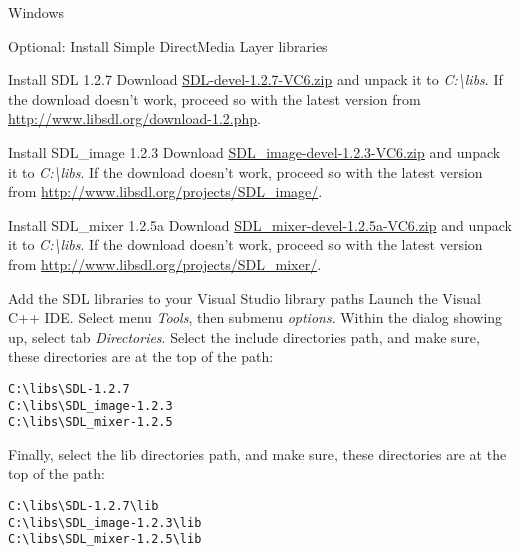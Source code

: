\begin{section}{Windows}
\begin{subsection}{Optional: Install Simple DirectMedia Layer libraries}
\begin{subsubsection}{Install SDL 1.2.7}
Download \href{http://www.libsdl.org/release/SDL-devel-1.2.7-VC6.zip}{SDL-devel-1.2.7-VC6.zip} and unpack it to \textit{C:\textbackslash{}libs}.
If the download doesn't work, proceed so with the latest version from \href{http://www.libsdl.org/download-1.2.php}{http://www.libsdl.org/download-1.2.php}.
\end{subsubsection}%

\begin{subsubsection}{Install SDL\_image 1.2.3}
Download \href{http://www.libsdl.org/projects/SDL_image/release/SDL_image-devel-1.2.3-VC6.zip}{SDL\_image-devel-1.2.3-VC6.zip} and unpack it to \textit{C:\textbackslash{}libs}.
If the download doesn't work, proceed so with the latest version from \href{http://www.libsdl.org/projects/SDL_image/}{http://www.libsdl.org/projects/SDL\_image/}.
\end{subsubsection}%

\begin{subsubsection}{Install SDL\_mixer 1.2.5a}
Download \href{http://www.libsdl.org/projects/SDL_mixer/release/SDL_mixer-devel-1.2.5a-VC6.zip}{SDL\_mixer-devel-1.2.5a-VC6.zip} and unpack it to \textit{C:\textbackslash{}libs}.
If the download doesn't work, proceed so with the latest version from \href{http://www.libsdl.org/projects/SDL_mixer/}{http://www.libsdl.org/projects/SDL\_mixer/}.
\end{subsubsection}%

\begin{subsubsection}{Add the SDL libraries to your Visual Studio library paths}
Launch the Visual C++ IDE. Select menu \textit{Tools}, then submenu \textit{options}. Within the dialog showing up, select tab \textit{Directories}. Select the include directories path, and make sure, these directories are at the top of the path:

\begin{verbatim}
C:\libs\SDL-1.2.7
C:\libs\SDL_image-1.2.3
C:\libs\SDL_mixer-1.2.5
\end{verbatim}

Finally, select the lib directories path, and make sure, these directories are at the top of the path:

\begin{verbatim}
C:\libs\SDL-1.2.7\lib
C:\libs\SDL_image-1.2.3\lib
C:\libs\SDL_mixer-1.2.5\lib
\end{verbatim}
\end{subsubsection}%
\end{subsection}%


\end{section}
